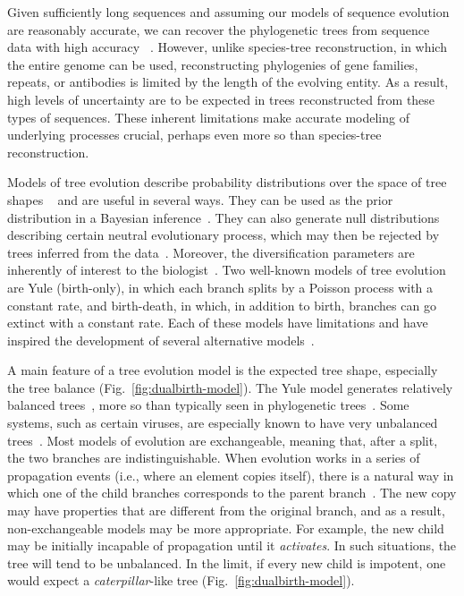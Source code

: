 Given sufficiently long sequences and assuming our models of sequence evolution are reasonably accurate, we can recover the phylogenetic trees from sequence data with high accuracy~ \cite{Felsenstein2003,Roch2010}. However, unlike species-tree reconstruction, in which the entire genome can be used, reconstructing phylogenies of gene families, repeats, or antibodies is limited by the length of the evolving entity. As a result, high levels of uncertainty are to be expected in trees reconstructed from these types of sequences. These inherent limitations make accurate modeling of underlying processes crucial, perhaps even more so than species-tree reconstruction.

Models of tree evolution describe probability distributions over the space of tree shapes ~\cite{Yule1925,Brown1994,Aldous2001} and are useful in several ways. They can be used as the prior distribution in a Bayesian inference~\cite{Drummond2007,Mooers2012,Sayyari2016}. They can also generate null distributions describing certain neutral evolutionary process, which may then be rejected by trees inferred from the data~\cite{Guyer1991,Kirkpatrick1993,Agapow2002}. Moreover, the diversification parameters are inherently of interest to the biologist~\cite{Morlon2014}. Two well-known models of tree evolution are Yule (birth-only), in which each branch splits by a Poisson process with a constant rate, and birth-death, in which, in addition to birth, branches can go extinct with a constant rate. Each of these models have limitations and have inspired the development of several alternative models~\cite{Aldous1996,Steel2001,Ford2005,Blum2006,Jones2011,Maddison2007}.

A main feature of a tree evolution model is the expected tree shape, especially the tree balance (Fig.~\ref{fig:dualbirth-model}). The Yule model generates relatively balanced trees~\cite{McKenzie2000}, more so than typically seen in phylogenetic trees~\cite{Blum2006}. Some systems, such as certain viruses, are especially known to have very unbalanced trees~\cite{Volz2013}. Most models of evolution are exchangeable, meaning that, after a split, the two branches are indistinguishable. When evolution works in a series of propagation events (i.e., where an element copies itself), there is a natural way in which one of the child branches corresponds to the parent branch~\cite{Lambert2013}. The new copy may have properties that are different from the original branch, and as a result, non-exchangeable models may be more appropriate. For example, the new child may be initially incapable of propagation until it \textit{activates}. In such situations, the tree will tend to be unbalanced. In the limit, if every new child is impotent, one would expect a {\em caterpillar}-like tree (Fig.~\ref{fig:dualbirth-model}).

